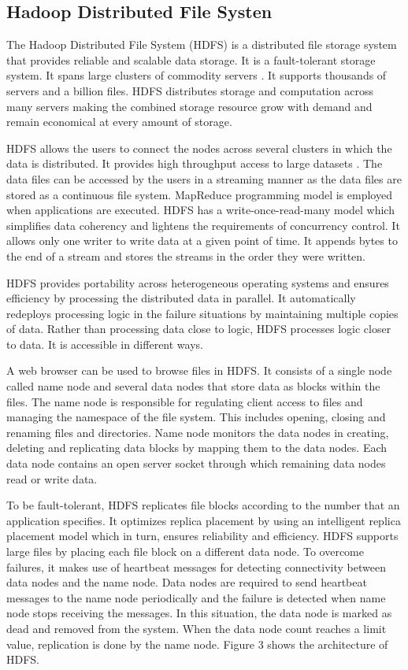 \documentclass[9pt,twocolumn,twoside]{../../styles/osajnl}
\begin{document}
\subsection{Hadoop Distributed File Systen}

The Hadoop Distributed File System (HDFS) is a distributed file
storage system that provides reliable and scalable data storage. It is
a fault-tolerant storage system. It spans large clusters of commodity
servers \cite{hdfsHorton}. It supports thousands of servers and a
billion files. HDFS distributes storage and computation across many
servers making the combined storage resource grow with demand and
remain economical at every amount of storage.

HDFS allows the users to connect the nodes across several clusters in
which the data is distributed. It provides high throughput access to
large datasets \cite{hdfsIbm}. The data files can be accessed by the
users in a streaming manner as the data files are stored as a
continuous file system. MapReduce programming model is employed when
applications are executed. HDFS has a write-once-read-many model which
simplifies data coherency and lightens the requirements of concurrency
control. It allows only one writer to write data at a given point of
time. It appends bytes to the end of a stream and stores the streams
in the order they were written.

HDFS provides portability across heterogeneous operating systems and
ensures efficiency by processing the distributed data in parallel. It
automatically redeploys processing logic in the failure situations by
maintaining multiple copies of data. Rather than processing data close
to logic, HDFS processes logic closer to data. It is accessible in
different ways. 

A web browser can be used to browse files in HDFS. It consists of a
single node called name node and several data nodes that store data as
blocks within the files. The name node is responsible for regulating
client access to files and managing the namespace of the file
system. This includes opening, closing and renaming files and
directories. Name node monitors the data nodes in creating, deleting
and replicating data blocks by mapping them to the data nodes. Each
data node contains an open server socket through which remaining data
nodes read or write data.

To be fault-tolerant, HDFS replicates file blocks according to the
number that an application specifies. It optimizes replica placement
by using an intelligent replica placement model which in turn, ensures
reliability and efficiency. HDFS supports large files by placing each
file block on a different data node. To overcome failures, it makes
use of heartbeat messages for detecting connectivity between data
nodes and the name node. Data nodes are required to send heartbeat
messages to the name node periodically and the failure is detected
when name node stops receiving the messages. In this situation, the
data node is marked as dead and removed from the system. When the data
node count reaches a limit value, replication is done by the name
node. Figure 3 shows the architecture of HDFS.
\end{document}
